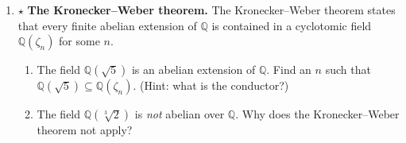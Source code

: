 \begin{enumerate}
    \item $\star$ \textbf{The Kronecker--Weber theorem.} The Kronecker--Weber theorem states that every finite abelian extension of $\mathbb{Q}$ is contained in a cyclotomic field $\mathbb{Q}(\zeta_n)$ for some $n$.
    \begin{enumerate}
        \item The field $\mathbb{Q}(\sqrt{5})$ is an abelian extension of $\mathbb{Q}$. Find an $n$ such that $\mathbb{Q}(\sqrt{5}) \subseteq \mathbb{Q}(\zeta_n)$. (Hint: what is the conductor?)
        \item The field $\mathbb{Q}(\sqrt[3]{2})$ is \emph{not} abelian over $\mathbb{Q}$. Why does the Kronecker--Weber theorem not apply?
    \end{enumerate}
\end{enumerate}
